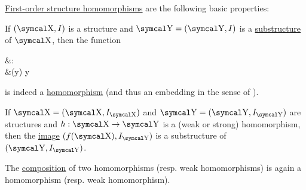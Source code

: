 \begin{proposition}\label{thm:first_order_homomorphism_properties}
  \hyperref[def:first_order_homomorphism]{First-order structure homomorphisms} are the following basic properties:
  \begin{PropEnum}
     If \( (\CX, I) \) is a structure and \( \CY = (\CY, I) \) is a \hyperref[def:first_order_substructure]{substructure} of \( \CX \), then the  function
    \begin{AlignedEquation}\label{thm:first_order_homomorphism_properties/substructure/canonical_embedding}
      &\iota: \CY \to \CX \\
      &\iota(y) \coloneqq y
    \end{AlignedEquation}
    is indeed a \hyperref[def:first_order_homomorphism/projection]{homomorphism} (and thus an embedding in the sense of ).

     If \( \CX = (\CX, I_{\CX}) \) and \( \CY = (\CY, I_{\CY}) \) are structures and \( h: \CX \to \CY \) is a (weak or strong) homomorphism, then the \hyperref[def:function/image]{image} \( (f(\CX), I_{\CY}) \) is a substructure of \( (\CY, I_{\CY}) \).

     The \hyperref[def:function/composition]{composition} of two homomorphisms (resp. weak homomorphisms) is again a homomorphism (resp. weak homomorphism).
  \end{PropEnum}
\end{proposition}
